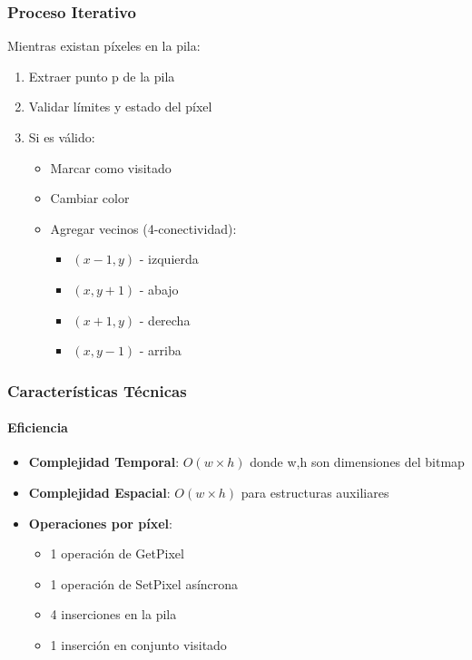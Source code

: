 \documentclass[12pt]{article}
\begin{document}
\subsubsection{Proceso Iterativo}
Mientras existan píxeles en la pila:
\begin{enumerate}
    \item Extraer punto p de la pila
    \item Validar límites y estado del píxel
    \item Si es válido:
    \begin{itemize}
        \item Marcar como visitado
        \item Cambiar color
        \item Agregar vecinos (4-conectividad):
            \begin{itemize}
                \item $(x-1,y)$ - izquierda
                \item $(x,y+1)$ - abajo
                \item $(x+1,y)$ - derecha
                \item $(x,y-1)$ - arriba
            \end{itemize}
    \end{itemize}
\end{enumerate}

\subsubsection{Características Técnicas}
\paragraph{Eficiencia}
\begin{itemize}
    \item \textbf{Complejidad Temporal}: $O(w \times h)$ donde w,h son dimensiones del bitmap
    \item \textbf{Complejidad Espacial}: $O(w \times h)$ para estructuras auxiliares
    \item \textbf{Operaciones por píxel}:
    \begin{itemize}
        \item 1 operación de GetPixel
        \item 1 operación de SetPixel asíncrona
        \item 4 inserciones en la pila
        \item 1 inserción en conjunto visitado
    \end{itemize}
\end{itemize}
\end{document}
